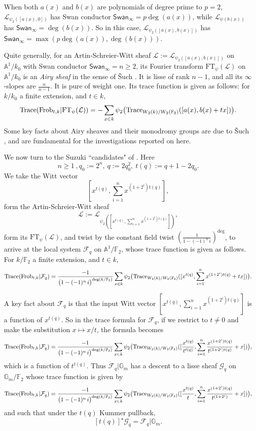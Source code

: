 \documentclass[11pt]{amsart}
\theoremstyle{plain}
\theoremstyle{definition}
\numberwithin{thm}{section}
\numberwithin{equation}{thm}
\newcommand{\Trace}{{\rm Trace}}
\newcommand{\Swan}{\mathsf {Swan}}
\newcommand{\sF}{{\mathcal F}}
\newcommand{\sG}{{\mathcal G}}
\newcommand{\sL}{{\mathcal L}}
\newcommand{\A}{{\mathbb A}}
\newcommand{\F}{{\mathbb F}}
\newcommand{\G}{{\mathbb G}}
\newcommand{\0}{\emptyset}
\newcommand{\Frob}{\mathrm{Frob}}
\newcommand{\FT}{\mathrm{FT}}
\begin{document}
When both $a(x)$ and $b(x)$ are polynomials of degree prime to $p=2$, $\sL_{\psi_2([a(x),0])}$ has Swan conductor 
$\Swan_\infty=p\deg(a(x))$, while $\sL_{\psi(b(x))}$ has $\Swan_\infty=\deg(b(x))$. So in this case, $\sL_{\psi_2([a(x),b(x)])}$ has $\Swan_\infty=\max(p\deg(a(x)), \deg(b(x)))$.

Quite generally, for an Artin-Schreier-Witt sheaf $\sL:=\sL_{\psi_2([a(x),b(x)])} $ on $\A^1/k_0$ with Swan conductor 
$\Swan_\infty =n \ge 2$, its Fourier transform
$\FT_\psi(\sL)$ on $\A^1/k_0$ is an {\it Airy sheaf} in the sense of  \v{S}uch \cite{Such}. It is lisse of rank $n-1$, and all its $\infty$-slopes are
$\frac{n}{n-1}$. It is pure of weight one. Its trace function is given as follows: for $k/k_0$ a finite extension, and $t \in k$, 
$$\Trace(\Frob_{t,k}|\FT_\psi(\sL))=-\sum_{x \in k}\psi_2\bigl(\Trace_{W_2(k)/W_2(\F_2)}([a(x),b(x)+tx])\bigr).$$
Some key facts about Airy sheaves and their monodromy groups are due to \v{S}uch \cite{Such}, and are fundamental for the investigations reported on here.

We now turn to the Suzuki ``candidates" of \cite{Ka-ERS}. Here 
$$n \ge 1\ , q_0:=2^n,\ q:=2q_0^2,\  t(q):=q+1-2q_0.$$ 
We take the Witt vector
$$[x^{t(q)},\sum_{i=1}^n x^{(1+2^i)t(q)}],$$
form the  Artin-Schreier-Witt sheaf 
$$\sL:=\sL_{\psi_2([x^{t(q)},\sum_{i=1}^n x^{(1+2^i)t(q)}])}, $$
form its $\FT_\psi(\sL)$, and twist by the constant field twist 
$(\frac{1}{1-(-1)^n\,i})^{\deg}$, to arrive at the local system $\sF_q$ on $\A^1/\F_2$, whose trace function is given as follows. For $k/\F_2$ a finite extension, and $t \in k$,
$$\Trace(\Frob_{t,k}|\sF_q) =\frac{-1}{\bigl(1-(-1)^n\,i\bigr)^{\deg(k/\F_2)}}\sum_{x \in k}\psi_2\bigl(\Trace_{W_2(k)/W_2(\F_2)}([x^{t(q)},\sum_{i=1}^n x^{(1+2^i)t(q)}+tx])\bigr).$$

A key fact about $\sF_q$ is that the input Witt vector $[x^{t(q)},\sum_{i=1}^n x^{(1+2^i)t(q)}]$ is a function of $x^{t(q)}$. So in the trace formula for $\sF_q$, if we restrict to $t \neq 0$ and make the substitution $x \mapsto x/t$, the formula becomes
$$\Trace(\Frob_{t,k}|\sF_q) =\frac{-1}{\bigl(1-(-1)^n\,i\bigr)^{\deg(k/\F_2)}}\sum_{x \in k}\psi_2\bigl(\Trace_{W_2(k)/W_2(\F_2)}([\frac{x^{t(q)}}{t^{t(q)}},\sum_{i=1}^n \frac{x^{(1+2^i)t(q)}}{t^{(1+2^i)t(q)}}+x])\bigr),$$
which is a function of $t^{t(q)}$.
Thus $\sF_q|\G_m$ has a descent to a lisse sheaf $\sG_q$ on $\G_m/\F_2$ whose trace function is given by
$$\Trace(\Frob_{t,k}|\sF_q) =\frac{-1}{\bigl(1-(-1)^n\,i\bigr)^{\deg(k/\F_2)}}\sum_{x \in k}\psi_2\bigl(\Trace_{W_2(k)/W_2(\F_2)}([\frac{x^{t(q)}}{t},\sum_{i=1}^n \frac{x^{(1+2^i)t(q)}}{t^{(1+2^i)}}+x])\bigr),$$
and such that under the $t(q)$ Kummer pullback, %
$$[t(q)]^\star \sG_q=\sF_q|\G_m.$$
\end{document}

